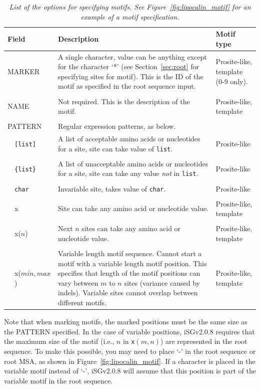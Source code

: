 \documentclass[10pt]{article}
\newcommand{\version}{2.0.8 }
\newcommand{\iSGcurrentshort}{iSGv\version }
\begin{document}
  \begin{table}
   \caption{\textit{List of the options for specifying motifs. See Figure~\ref{fig:lipocalin_motif} for an example of a motif specification.}}
   \begin{tabular}{p{0.1in}p{1in}p{3in}p{1.5in}}
	\hline\hline
	\multicolumn{2}{l}{Field} & Description & Motif type \\
	\hline
    \multicolumn{2}{l}{MARKER} &  A single character, value can be anything except for the character `*' (see Section~\ref{sec:root} for specifying sites for motif).  This is the ID of the motif as specified in the root sequence input. & Prosite-like, template (0-9 only). \\\\
    \multicolumn{2}{l}{NAME} & Not required. This is the description of the motif. & Prosite-like, template\\\\
    \multicolumn{2}{l}{PATTERN} & Regular expression patterns, as below.\\
	 & {\tt [list]} & A list of acceptable amino acids or nucleotides for a site, site can take value of {\tt list}. & Prosite-like \\\\
	 & {\tt \{list\}} & A list of unacceptable amino acids or nucleotides for a site, site can take any value \emph{not} in {\tt list}. & Prosite-like \\\\
	 & {\tt char} & Invariable site, takes value of {\tt char}. & Prosite-like \\\\
	 & x & Site can take any amino acid or nucleotide value. & Prosite-like, template \\\\
	 & x($n$) & Next $n$ sites can take any amino acid or nucleotide value. & Prosite-like, template \\\\
	 & x($min,max$) & Variable length motif sequence. Cannot start a motif with a variable length motif position. This specifies that length of the motif positions can vary between $m$ to $n$ sites (variance caused by indels). Variable sites cannot overlap between different motifs. & Prosite-like, template \\
	\hline
   \end{tabular}
   \label{tab:motif_spec}
  \end{table}

 Note that when marking motifs, the marked positions must be the same size as the PATTERN specified. In the case of variable positions, \iSGcurrentshort requires that the maximum size of the motif (i.e., $n$ in {\tt x$(m,n)$}) are represented in the root sequence. To make this possible, you may need to place `-' in the root sequence or root MSA, as shown in Figure~\ref{fig:lipocalin_motif}. If a character is placed in the variable motif instead of `-', \iSGcurrentshort will assume that this position is part of the variable motif in the root sequence.
\end{document}
